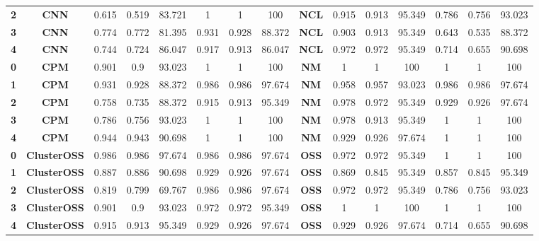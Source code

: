 {{\begin{tabular}{c|c|cccccc|ccccccc}
\textbf{2} & \textbf{CNN} & 0.615 & 0.519 & 83.721 & 1     & 1     & 100   & \multicolumn{1}{c|}{\textbf{NCL}} & 0.915 & 0.913 & 95.349 & 0.786 & 0.756 & 93.023 \\
\textbf{3} & \textbf{CNN} & 0.774 & 0.772 & 81.395 & 0.931 & 0.928 & 88.372 & \multicolumn{1}{c|}{\textbf{NCL}} & 0.903 & 0.913 & 95.349 & 0.643 & 0.535 & 88.372 \\
\textbf{4} & \textbf{CNN} & 0.744 & 0.724 & 86.047 & 0.917 & 0.913 & 86.047 & \multicolumn{1}{c|}{\textbf{NCL}} & 0.972 & 0.972 & 95.349 & 0.714 & 0.655 & 90.698 \\
\textbf{0} & \textbf{CPM} & 0.901 & 0.9   & 93.023 & 1     & 1     & 100   & \multicolumn{1}{c|}{\textbf{NM}} & 1     & 1     & 100   & 1     & 1     & 100 \\
\textbf{1} & \textbf{CPM} & 0.931 & 0.928 & 88.372 & 0.986 & 0.986 & 97.674 & \multicolumn{1}{c|}{\textbf{NM}} & 0.958 & 0.957 & 93.023 & 0.986 & 0.986 & 97.674 \\
\textbf{2} & \textbf{CPM} & 0.758 & 0.735 & 88.372 & 0.915 & 0.913 & 95.349 & \multicolumn{1}{c|}{\textbf{NM}} & 0.978 & 0.972 & 95.349 & 0.929 & 0.926 & 97.674 \\
\textbf{3} & \textbf{CPM} & 0.786 & 0.756 & 93.023 & 1     & 1     & 100   & \multicolumn{1}{c|}{\textbf{NM}} & 0.978 & 0.913 & 95.349 & 1     & 1     & 100 \\
\textbf{4} & \textbf{CPM} & 0.944 & 0.943 & 90.698 & 1     & 1     & 100   & \multicolumn{1}{c|}{\textbf{NM}} & 0.929 & 0.926 & 97.674 & 1     & 1     & 100 \\
\textbf{0} & \textbf{ClusterOSS} & 0.986 & 0.986 & 97.674 & 0.986 & 0.986 & 97.674 & \multicolumn{1}{c|}{\textbf{OSS}} & 0.972 & 0.972 & 95.349 & 1     & 1     & 100 \\
\textbf{1} & \textbf{ClusterOSS} & 0.887 & 0.886 & 90.698 & 0.929 & 0.926 & 97.674 & \multicolumn{1}{c|}{\textbf{OSS}} & 0.869 & 0.845 & 95.349 & 0.857 & 0.845 & 95.349 \\
\textbf{2} & \textbf{ClusterOSS} & 0.819 & 0.799 & 69.767 & 0.986 & 0.986 & 97.674 & \multicolumn{1}{c|}{\textbf{OSS}} & 0.972 & 0.972 & 95.349 & 0.786 & 0.756 & 93.023 \\
\textbf{3} & \textbf{ClusterOSS} & 0.901 & 0.9   & 93.023 & 0.972 & 0.972 & 95.349 & \multicolumn{1}{c|}{\textbf{OSS}} & 1     & 1     & 100   & 1     & 1     & 100 \\
\textbf{4} & \textbf{ClusterOSS} & 0.915 & 0.913 & 95.349 & 0.929 & 0.926 & 97.674 & \multicolumn{1}{c|}{\textbf{OSS}} & 0.929 & 0.926 & 97.674 & 0.714 & 0.655 & 90.698 \\

\end{tabular}}}
